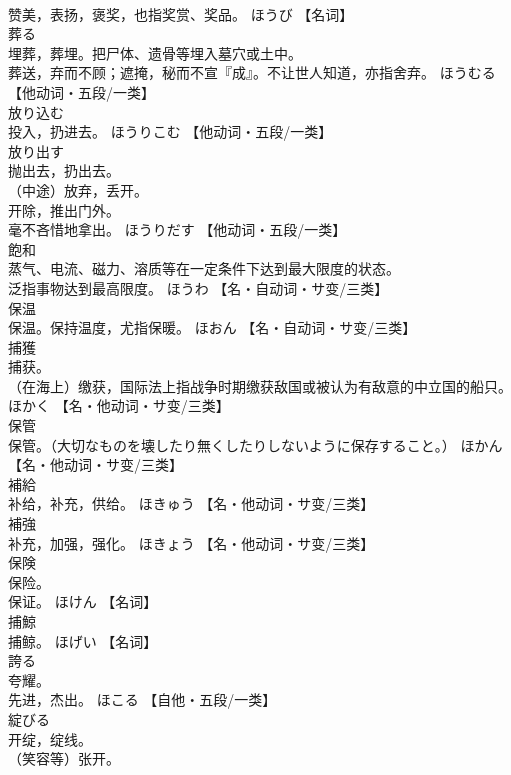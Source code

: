 \documentclass[8pt]{extreport}
\begin{document}
\begin{CJK}{UTF8}{min}
\\	赞美，表扬，褒奖，也指奖赏、奖品。	ほうび		【名词】
\\	葬る	
\\	埋葬，葬埋。把尸体、遗骨等埋入墓穴或土中。 
\\	葬送，弃而不顾；遮掩，秘而不宣『成』。不让世人知道，亦指舍弃。	ほうむる		【他动词・五段/一类】
\\	放り込む	
\\	投入，扔进去。	ほうりこむ		【他动词・五段/一类】
\\	放り出す	
\\	抛出去，扔出去。 
\\	（中途）放弃，丢开。 
\\	开除，推出门外。 
\\	毫不吝惜地拿出。	ほうりだす		【他动词・五段/一类】
\\	飽和	
\\	蒸气、电流、磁力、溶质等在一定条件下达到最大限度的状态。 
\\	泛指事物达到最高限度。	ほうわ		【名・自动词・サ变/三类】
\\	保温	
\\	保温。保持温度，尤指保暖。	ほおん		【名・自动词・サ变/三类】
\\	捕獲	
\\	捕获。 
\\	（在海上）缴获，国际法上指战争时期缴获敌国或被认为有敌意的中立国的船只。	ほかく		【名・他动词・サ变/三类】
\\	保管	
\\	保管。（大切なものを壊したり無くしたりしないように保存すること。）	ほかん		【名・他动词・サ变/三类】
\\	補給	
\\	补给，补充，供给。	ほきゅう		【名・他动词・サ变/三类】
\\	補強	
\\	补充，加强，强化。	ほきょう		【名・他动词・サ变/三类】
\\	保険	
\\	保险。 
\\	保证。	ほけん		【名词】
\\	捕鯨	
\\	捕鲸。	ほげい		【名词】
\\	誇る	
\\	夸耀。 
\\	先进，杰出。	ほこる		【自他・五段/一类】
\\	綻びる	
\\	开绽，绽线。 
\\	（笑容等）张开。 

\end{CJK}
\end{document}
